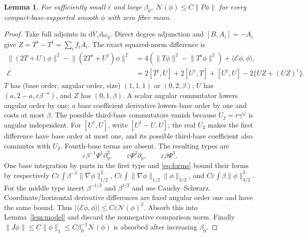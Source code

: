 \documentclass[11pt]{article}
\newtheorem{lemma}[theorem]{Lemma}
\theoremstyle{definition}\newtheorem{definition}[theorem]{Definition}
\theoremstyle{remark}\newtheorem{remark}[theorem]{Remark}
\newcommand{\dd}{\mathrm d}
\newcommand{\vol}{\dd V}
\newcommand{\ip}[2]{\langle #1,#2\rangle}
\newcommand{\norm}[1]{\lVert #1\rVert}
\begin{document}
\begin{lemma}\label{lem:Pcoercive}
For sufficiently small $\varepsilon$ and large $\beta_0$,
$\mathcal N(\phi)\le C\norm{P\phi}$ for every compact-base-supported
smooth $\phi$ with zero fiber mean.
\end{lemma}
\begin{proof}
Take full adjoints in $\vol_\gamma\dd\omega_y$. Direct degree adjunction
and $[B,A_i]=-A_i$ give $Z=T^\flat-T^\dagger=\sum_i f_iA_i$.
The exact squared-norm difference is
\begin{align}\label{eq:error}
 \norm{(2T+U)\phi}^2-\norm{(2T^\flat+U^\dagger)\phi}^2
 &=4(\norm{T\phi}^2-\norm{T^\flat\phi}^2)+\ip{\mathcal E\phi}{\phi},\\
 \mathcal E&=2[T^\dagger,U]+2[U^\dagger,T]+[U^\dagger,U]
                            -2\{UZ+(UZ)^\dagger\}.\nonumber
\end{align}
$T$ has (base order, angular order, size) $(1,1,1)$ or $(0,2,\beta)$;
$U$ has $(a,2-a,\varepsilon\beta^{-a})$, and $Z$ has $(0,1,\beta)$.
A scalar angular commutator lowers angular order by one; a base coefficient
derivative lowers base order by one and costs at most $\beta$.
The possible third-base commutators vanish because $U_2=r\gamma^{ij}$
is angular independent. For $[U^\dagger,U]$, write
$[U^\dagger-U,U]$; the real $U_2$ makes the first difference have base
order at most one, and its possible third-base coefficient also commutes
with $U_2$. Fourth-base terms are absent. The resulting types are
\[
 \varepsilon\beta^{-1}\Psi^1\partial_y^2,\qquad
 \varepsilon\Psi^2\partial_y,\qquad\varepsilon\beta\Psi^3.
\]
One base integration by parts in the first type and \eqref{eq:forms}
bound their forms by respectively
$C\varepsilon\int\beta^{-1}\norm{\nabla\phi}_{1/2}^2$,
$C\varepsilon\int\norm{\nabla\phi}_{1/2}\norm{\phi}_{3/2}$, and
$C\varepsilon\int\beta\norm{\phi}_{3/2}^2$.
For the middle type insert $\beta^{-1/2}$ and $\beta^{1/2}$ and use
Cauchy--Schwarz. Coordinate/horizontal derivative differences are fixed
angular order one and have the same bound. Thus
$|\ip{\mathcal E\phi}{\phi}|\le C\varepsilon\mathcal N(\phi)^2$.
Absorb this into Lemma~\ref{lem:model} and discard the nonnegative
comparison norm. Finally
$\norm{J\phi}\le C\norm{\phi}_1\le C\beta_0^{-1}\mathcal N(\phi)$
is absorbed after increasing $\beta_0$.
\end{proof}
\end{document}

